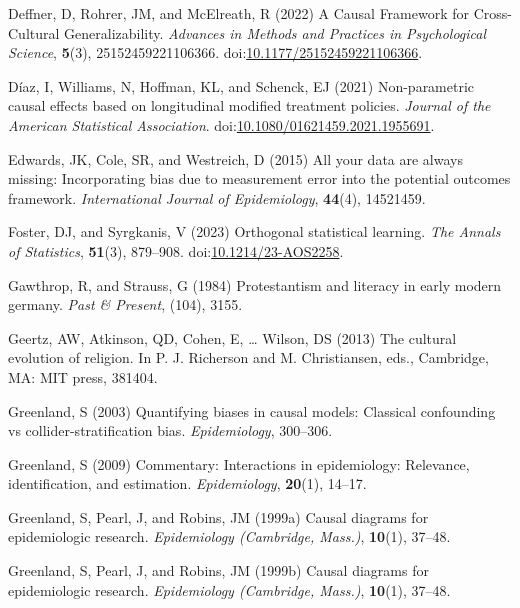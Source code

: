 \documentclass[
  singlecolumn]{article}
\newlength{\cslhangindent}
\newenvironment{CSLReferences}[2] %
 {\begin{list}{}{%
  \setlength{\itemindent}{0pt}
  \setlength{\leftmargin}{0pt}
  \setlength{\parsep}{0pt}
  \ifodd #1
   \setlength{\leftmargin}{\cslhangindent}
   \setlength{\itemindent}{-1\cslhangindent}
  \fi
  \setlength{\itemsep}{#2\baselineskip}}}
 {\end{list}}
\begin{document}
\begin{CSLReferences}{1}{0}
Deffner, D, Rohrer, JM, and McElreath, R (2022) A Causal Framework for
Cross-Cultural Generalizability. \emph{Advances in Methods and Practices
in Psychological Science}, \textbf{5}(3), 25152459221106366.
doi:\href{https://doi.org/10.1177/25152459221106366}{10.1177/25152459221106366}.

Díaz, I, Williams, N, Hoffman, KL, and Schenck, EJ (2021) Non-parametric
causal effects based on longitudinal modified treatment policies.
\emph{Journal of the American Statistical Association}.
doi:\href{https://doi.org/10.1080/01621459.2021.1955691}{10.1080/01621459.2021.1955691}.

Edwards, JK, Cole, SR, and Westreich, D (2015) All your data are always
missing: Incorporating bias due to measurement error into the potential
outcomes framework. \emph{International Journal of Epidemiology},
\textbf{44}(4), 14521459.

Foster, DJ, and Syrgkanis, V (2023) Orthogonal statistical learning.
\emph{The Annals of Statistics}, \textbf{51}(3), 879--908.
doi:\href{https://doi.org/10.1214/23-AOS2258}{10.1214/23-AOS2258}.

Gawthrop, R, and Strauss, G (1984) Protestantism and literacy in early
modern germany. \emph{Past \& Present}, (104), 3155.

Geertz, AW, Atkinson, QD, Cohen, E, \ldots{} Wilson, DS (2013) The
cultural evolution of religion. In P. J. Richerson and M. Christiansen,
eds., Cambridge, MA: MIT press, 381404.

Greenland, S (2003) Quantifying biases in causal models: Classical
confounding vs collider-stratification bias. \emph{Epidemiology},
300--306.

Greenland, S (2009) Commentary: Interactions in epidemiology: Relevance,
identification, and estimation. \emph{Epidemiology}, \textbf{20}(1),
14--17.

Greenland, S, Pearl, J, and Robins, JM (1999a) Causal diagrams for
epidemiologic research. \emph{Epidemiology (Cambridge, Mass.)},
\textbf{10}(1), 37--48.

Greenland, S, Pearl, J, and Robins, JM (1999b) Causal diagrams for
epidemiologic research. \emph{Epidemiology (Cambridge, Mass.)},
\textbf{10}(1), 37--48.


\end{CSLReferences}
\end{document}
